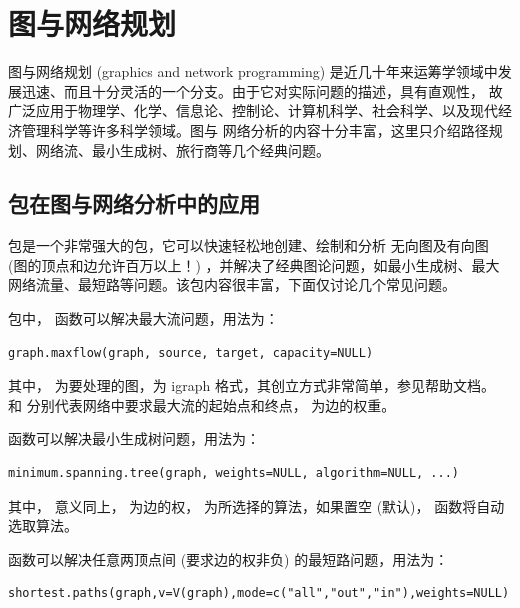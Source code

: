  \section{图与网络规划}
 图与网络规划 (graphics and network programming) 是近几十年来运筹学领域中发展迅速、而且十分灵活的一个分支。由于它对实际问题的描述，具有直观性，
 故广泛应用于物理学、化学、信息论、控制论、计算机科学、社会科学、以及现代经济管理科学等许多科学领域。图与
 网络分析的内容十分丰富，这里只介绍路径规划、网络流、最小生成树、旅行商等几个经典问题。



\subsection{ 包在图与网络分析中的应用}
 包\citep{igraph06}是一个非常强大的包，它可以快速轻松地创建、绘制和分析
无向图及有向图 (图的顶点和边允许百万以上！)
，并解决了经典图论问题，如最小生成树、最大网络流量、最短路等问题。该包内容很丰富，下面仅讨论几个常见问题。


包中， 函数可以解决最大流问题，用法为：

\begin{verbatim}
graph.maxflow(graph, source, target, capacity=NULL)
\end{verbatim}

其中， 为要处理的图，为 igraph 格式，其创立方式非常简单，参见帮助文档。
 和  分别代表网络中要求最大流的起始点和终点， 为边的权重。


 函数可以解决最小生成树问题，用法为：

\begin{verbatim}
minimum.spanning.tree(graph, weights=NULL, algorithm=NULL, ...)
\end{verbatim}

其中， 意义同上， 为边的权， 为所选择的算法，如果置空 (默认)，
函数将自动选取算法。


 函数可以解决任意两顶点间 (要求边的权非负) 的最短路问题，用法为：

\begin{verbatim}
shortest.paths(graph,v=V(graph),mode=c("all","out","in"),weights=NULL)
\end{verbatim}

